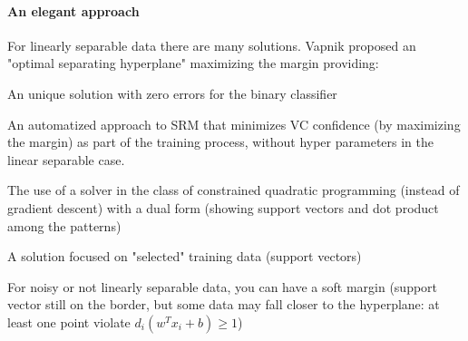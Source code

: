 \documentclass[10pt]{report}
\begin{document}
\paragraph{An elegant approach} For linearly separable data there are many solutions. Vapnik proposed an "optimal separating hyperplane" maximizing the margin providing:
\begin{list}{}{}
	\item An unique solution with zero errors for the binary classifier
	\item An automatized approach to SRM that minimizes VC confidence (by maximizing the margin) as part of the training process, without hyper parameters in the linear separable case.
	\item The use of a solver in the class of constrained quadratic programming (instead of gradient descent) with a dual form (showing support vectors and dot product among the patterns)
	\item A solution focused on "selected" training data (support vectors)
\end{list}
For noisy or not linearly separable data, you can have a soft margin (support vector still on the border, but some data may fall closer to the hyperplane: at least one point violate $d_i(w^Tx_i+b)\geq 1$)
\end{document}
